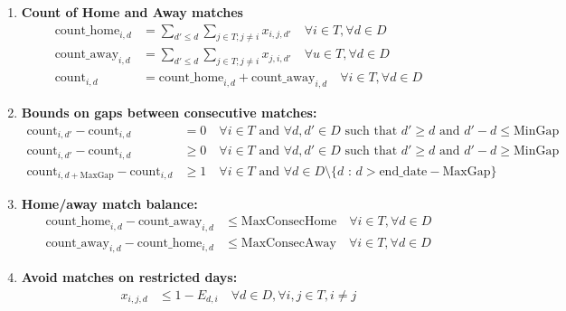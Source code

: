 \documentclass[a4paper, 12pt]{article}
\begin{document}
\begin{enumerate}
    \item \textbf{Count of Home and Away matches}
    \begin{align*}
        \text{count\_home}_{i,d} &= \sum_{d' \leq d} \sum_{j \in T; j \neq i} x_{i,j,d'} \quad \forall i \in T , \forall d \in D \\
        \text{count\_away}_{i,d} &= \sum_{d' \leq d} \sum_{j \in T; j \neq i} x_{j,i,d'} \quad \forall u \in T, \forall d \in D \\
        \text{count}_{i,d} &= \text{count\_home}_{i,d} + \text{count\_away}_{i,d} \quad \forall i \in T, \forall d \in D
    \end{align*}


    \item \textbf{Bounds on gaps between consecutive matches:}
    \begin{align*}
        \text{count}_{i,d'} - \text{count}_{i,d} &= 0 \quad \forall i \in T \text{ and } \forall d, d' \in D \text{ such that $d' \geq d$ and $d' - d \leq \text{MinGap}$} \\
        \text{count}_{i,d'} - \text{count}_{i,d} &\geq 0 \quad \forall i \in T \text{ and } \forall d, d' \in D \text{ such that $d' \geq d$ and $d' - d \geq \text{MinGap}$} \\
        \text{count}_{i,d+\text{MaxGap}} - \text{count}_{i,d} &\geq 1 \quad \forall i \in T \text{ and } \forall d \in D \setminus \{d \text{ : } d > \text{end\_date} - \text{MaxGap} \} 
    \end{align*}

    \item \textbf{Home/away match balance:}
    \begin{align*}
        \text{count\_home}_{i,d} - \text{count\_away}_{i,d} &\leq \text{MaxConsecHome} \quad \forall i \in T , \forall d \in D \\
        \text{count\_away}_{i,d} - \text{count\_home}_{i,d} &\leq \text{MaxConsecAway} \quad \forall i \in T , \forall d \in D
    \end{align*}

    \item \textbf{Avoid matches on restricted days:}
    \begin{align*}
        x_{i,j,d} &\leq 1 - E_{d,i} \quad \forall d \in D, \forall i,j \in T, i \neq j
    \end{align*}


\end{enumerate}
\end{document}
